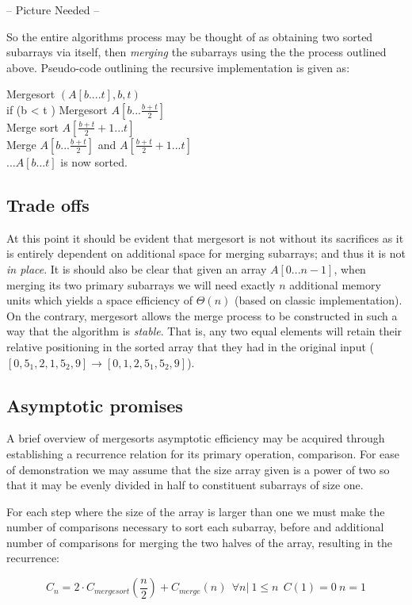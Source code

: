 \documentclass[11pt,letterpaper]{report}
\begin{document}
-- Picture Needed --

So the entire algorithms process may be thought of as obtaining two sorted subarrays via itself, then \emph{merging} the subarrays using the the process outlined above. Pseudo-code outlining the recursive implementation is given as:

Mergesort $(A[b....t], b, t)$ \\
if (b < t )
Mergesort $A[b...\frac{b+t}{2}]$ \\
Merge sort $A[\frac{b+t}{2}+1...t]$ \\
Merge $A[b...\frac{b+t}{2}]$ and $A[\frac{b+t}{2}+1...t]$\\
...$A[b...t]$ is now sorted.\\


\subsection*{Trade offs}
At this point it should be evident that mergesort is not without its sacrifices as it is entirely dependent on additional space for merging subarrays; and thus it is not \emph{in place}. It is should also be clear that given an array $A[0...n-1]$, when merging its two primary subarrays we will need exactly $n$ additional memory units which yields a space efficiency of $\Theta(n)$ (based on classic implementation). On the contrary, mergesort allows the merge process to be constructed in such a way that the algorithm is \emph{stable}. That is, any two equal elements will retain their relative positioning in the sorted array that they had in the original input ($[0,5_1,2,1,5_2,9] \rightarrow [0,1,2,5_1,5_2,9]$).

\subsection*{Asymptotic promises}
A brief overview of mergesorts asymptotic efficiency may be acquired through establishing a recurrence relation for its primary operation, comparison. For ease of demonstration we may assume that the size array given is a power of two so that it may be evenly divided in half to constituent subarrays of size one. 

For each step where the size of the array is larger than one we must make the number of comparisons necessary to sort each subarray, before and additional number of comparisons for merging the two halves of the array, resulting in the recurrence: 

\begin{equation} 
C_n=2 \cdot C_{mergesort}(\frac{n}{2})+C_{merge}(n) \ \ \forall n | \ 1 \leq n \ \ C(1) = 0 \ n=1
\end{equation}
\end{document}
